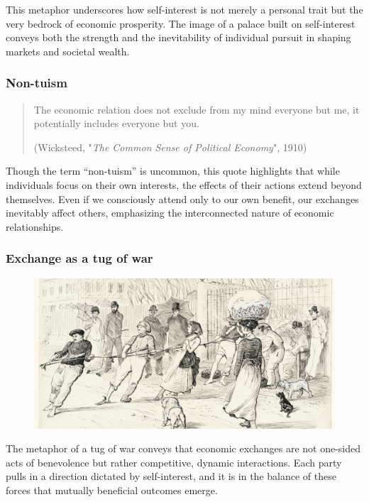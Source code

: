             This metaphor underscores how self-interest is not merely a personal trait but the very bedrock of economic prosperity. The image of a palace built on self-interest conveys both the strength and the inevitability of individual pursuit in shaping markets and societal wealth.

        \subsubsection{Non-tuism}

            \begin{quote}
                The economic relation does not exclude from my mind everyone but me, it potentially includes everyone but you.
                
                (Wicksteed, "\textit{The Common Sense of Political Economy}", 1910)
            \end{quote}

            Though the term “non-tuism” is uncommon, this quote highlights that while individuals focus on their own interests, the effects of their actions extend beyond themselves. Even if we consciously attend only to our own benefit, our exchanges inevitably affect others, emphasizing the interconnected nature of economic relationships.

        \subsubsection{Exchange as a tug of war}

            \begin{figure}[h]
                \centering
                \includegraphics[width=0.5\linewidth]{Images/L6-1.png}
                \label{fig:L6-1}
            \end{figure}

            The metaphor of a tug of war conveys that economic exchanges are not one-sided acts of benevolence but rather competitive, dynamic interactions. Each party pulls in a direction dictated by self-interest, and it is in the balance of these forces that mutually beneficial outcomes emerge.

